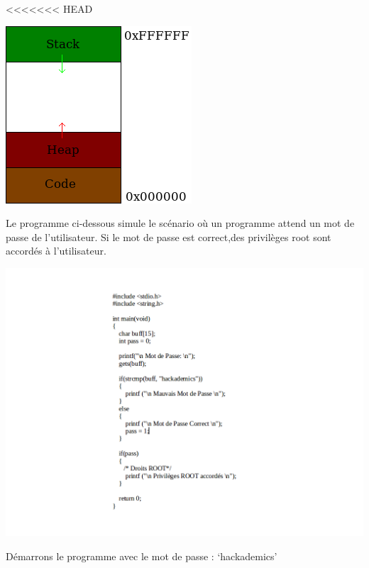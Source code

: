 <<<<<<< HEAD
\begin{center}
\vspace{0.5cm}
\includegraphics[scale=0.3]{Application/assets/stack.png}
\vspace{0.5cm}
\end{center}

Le programme ci-dessous simule le scénario où un programme attend un mot de passe de l'utilisateur. Si le mot de passe est correct,des privilèges root sont accordés à l'utilisateur.

\begin{center}
\vspace{0.5cm}
\includegraphics[scale=0.3]{Application/assets/codebo.png}
\vspace{0.5cm}
\end{center}

Démarrons le programme avec le mot de passe : ‘hackademics'

